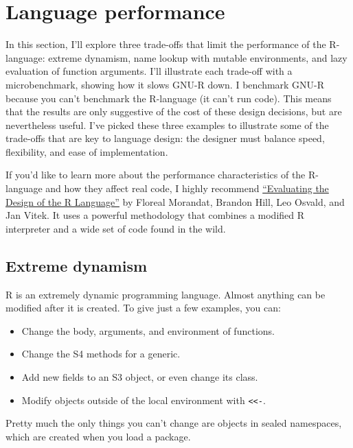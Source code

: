 \hypertarget{language-performance}{%
\section{Language performance}\label{language-performance}}

In this section, I'll explore three trade-offs that limit the
performance of the R-language: extreme dynamism, name lookup with
mutable environments, and lazy evaluation of function arguments. I'll
illustrate each trade-off with a microbenchmark, showing how it slows
GNU-R down. I benchmark GNU-R because you can't benchmark the R-language
(it can't run code). This means that the results are only suggestive of
the cost of these design decisions, but are nevertheless useful. I've
picked these three examples to illustrate some of the trade-offs that
are key to language design: the designer must balance speed,
flexibility, and ease of implementation.

If you'd like to learn more about the performance characteristics of the
R-language and how they affect real code, I highly recommend
\href{http://r.cs.purdue.edu/pub/ecoop12.pdf}{``Evaluating the Design of
the R Language''} by Floreal Morandat, Brandon Hill, Leo Osvald, and Jan
Vitek. It uses a powerful methodology that combines a modified R
interpreter and a wide set of code found in the wild.

\hypertarget{extreme-dynamism}{%
\subsection{Extreme dynamism}\label{extreme-dynamism}}

R is an extremely dynamic programming language. Almost anything can be
modified after it is created. To give just a few examples, you can:

\begin{itemize}
\tightlist
\item
  Change the body, arguments, and environment of functions.
\item
  Change the S4 methods for a generic.
\item
  Add new fields to an S3 object, or even change its class.
\item
  Modify objects outside of the local environment with
  \texttt{\textless{}\textless{}-}.
\end{itemize}

Pretty much the only things you can't change are objects in sealed
namespaces, which are created when you load a package.

